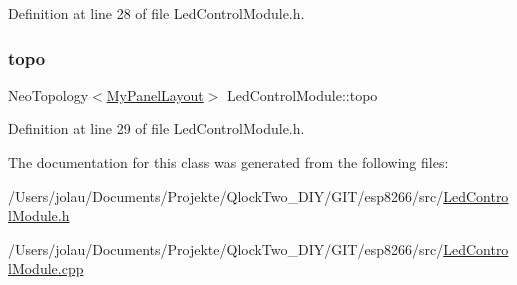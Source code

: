 Definition at line 28 of file Led\+Control\+Module.\+h.

\mbox{\label{class_led_control_module_a0b71b57d3f564529c89be8877dbfaa6b}} 
\subsubsection{\texorpdfstring{topo}{topo}}
{\footnotesize\ttfamily Neo\+Topology$<$\mbox{\hyperlink{_led_control_module_8h_a49b2323848e516b3241e758de64f0b3b}{My\+Panel\+Layout}}$>$ Led\+Control\+Module\+::topo\hspace{0.3cm}{\ttfamily [private]}}



Definition at line 29 of file Led\+Control\+Module.\+h.



The documentation for this class was generated from the following files\+:\begin{DoxyCompactItemize}
\item 
/\+Users/jolau/\+Documents/\+Projekte/\+Qlock\+Two\+\_\+\+D\+I\+Y/\+G\+I\+T/esp8266/src/\mbox{\hyperlink{_led_control_module_8h}{Led\+Control\+Module.\+h}}\item 
/\+Users/jolau/\+Documents/\+Projekte/\+Qlock\+Two\+\_\+\+D\+I\+Y/\+G\+I\+T/esp8266/src/\mbox{\hyperlink{_led_control_module_8cpp}{Led\+Control\+Module.\+cpp}}\end{DoxyCompactItemize}
